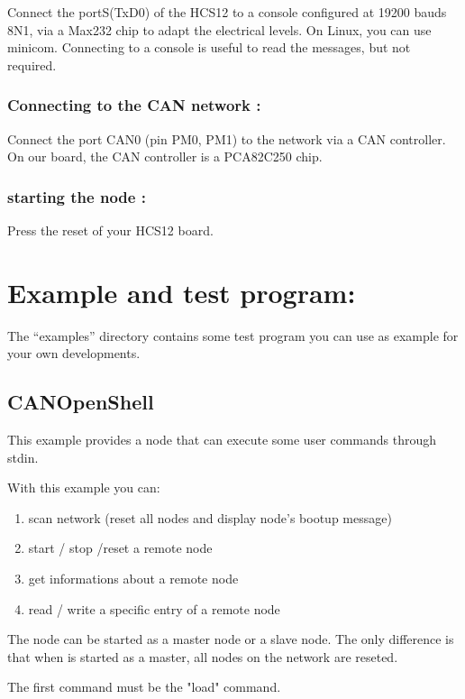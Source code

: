 \documentclass[12pt,english,a4paper]{book}
\begin{document}
Connect the portS(TxD0) of the HCS12 to a console configured at 19200
bauds 8N1, via a Max232 chip to adapt the electrical levels. On Linux,
you can use minicom. Connecting to a console is useful to read the
messages, but not required.


\subsubsection{Connecting to the CAN network :}

Connect the port CAN0 (pin PM0, PM1) to the network via a CAN controller.
On our board, the CAN controller is a PCA82C250 chip.


\subsubsection{starting the node :}

Press the reset of your HCS12 board.


\section{Example and test program:}

The {}``examples'' directory contains some test program you can
use as example for your own developments.

\subsection{CANOpenShell}

This example provides a node that can execute some user commands through stdin. 

With this example you can:
\begin{enumerate}
\item scan network (reset all nodes and display node's bootup message)
\item start / stop /reset a remote node
\item get informations about a remote node
\item read / write a specific entry of a remote node
\end{enumerate}

The node can be started as a master node or a slave node. The only difference is 
that when is started as a master, all nodes on the network are reseted.

The first command must be the "load" command.
\end{document}
